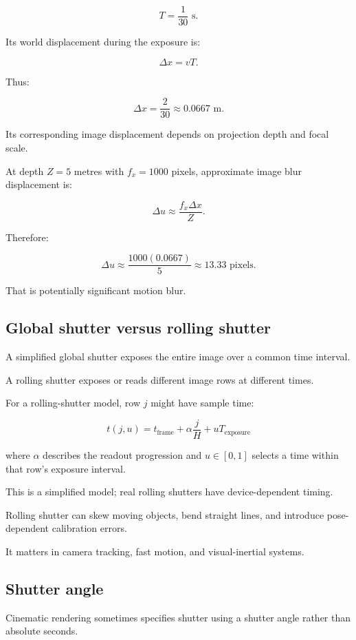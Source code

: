 \[ T=\frac1{30}\text{ s}. \]

Its world displacement during the exposure is:

\[ \Delta x=vT. \]

Thus:

\[ \boxed{ \Delta x=\frac2{30}\approx0.0667\text{ m}. } \]

Its corresponding image displacement depends on projection depth and focal scale.

At depth \(Z=5\) metres with \(f_x=1000\) pixels, approximate image blur displacement is:

\[ \Delta u\approx\frac{f_x\Delta x}{Z}. \]

Therefore:

\[ \Delta u\approx \frac{1000(0.0667)}5 \approx\boxed{13.33\text{ pixels}}. \]

That is potentially significant motion blur.

\subsection{Global shutter versus rolling shutter}\label{02-foundations-ii-ch036-global-shutter-versus-rolling-shutter}

A simplified global shutter exposes the entire image over a common time interval.

A rolling shutter exposes or reads different image rows at different times.

For a rolling-shutter model, row \(j\) might have sample time:

\[ \boxed{ t(j,u)= t_{\mathrm{frame}} +\alpha\frac jH +uT_{\mathrm{exposure}} } \]

where \(\alpha\) describes the readout progression and \(u\in[0,1]\) selects a time within that row's exposure interval.

This is a simplified model; real rolling shutters have device-dependent timing.

Rolling shutter can skew moving objects, bend straight lines, and introduce pose-dependent calibration errors.

It matters in camera tracking, fast motion, and visual-inertial systems.

\subsection{Shutter angle}\label{02-foundations-ii-ch036-shutter-angle}

Cinematic rendering sometimes specifies shutter using a shutter angle rather than absolute seconds.

